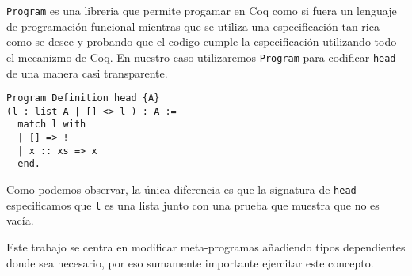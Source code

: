\lstinline{Program} es una libreria que permite progamar en Coq como si fuera un lenguaje de programación funcional mientras que se utiliza una especificación tan rica como se desee y probando que el codigo cumple la especificación utilizando todo el mecanizmo de Coq. En nuestro caso utilizaremos \lstinline{Program} para codificar \lstinline{head} de una manera casi transparente.
\begin{lstlisting}
Program Definition head {A}
(l : list A | [] <> l ) : A :=
  match l with
  | [] => !
  | x :: xs => x
  end.
\end{lstlisting}
Como podemos observar, la única diferencia es que la signatura de \lstinline{head} especificamos que \lstinline{l} es una lista junto con una prueba que muestra que no es vacía.

Este trabajo se centra en modificar meta-programas añadiendo tipos dependientes donde sea necesario, por eso sumamente importante ejercitar este concepto.


